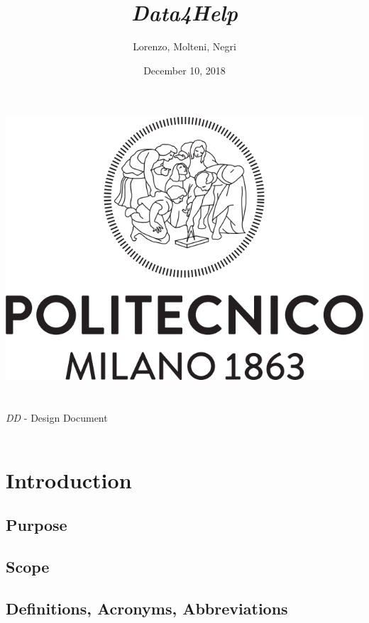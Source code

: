 \documentclass[titlepage]{article}
\title{{\Huge {\it Data4Help}}}
\author{Lorenzo, Molteni, Negri}
\date{December 10, 2018}
\begin{document}
\makeatletter
    \begin{titlepage}
        \begin{center}
            \includegraphics[width=\linewidth]{logo.png}\\[20ex]
            {\huge  \@title }\\[2ex] 
            {\LARGE  \@author}\\[3ex] 
            {\LARGE {\it DD} - Design Document}\\[3ex]
            {\large \@date}\\[5ex]
        \end{center}
    \end{titlepage}
\makeatother
\thispagestyle{empty}
\newpage

\thispagestyle{empty}
\newpage


	
\pagebreak
\tableofcontents{}
\pagebreak

\section{Introduction}
\subsection{Purpose}
\subsection{Scope}
\subsection{Definitions, Acronyms, Abbreviations}
\end{document}
